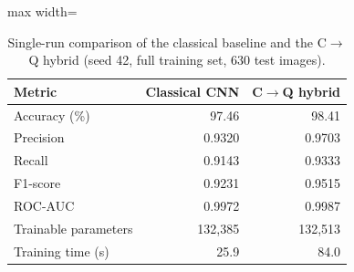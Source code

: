 \begin{table}[htbp]
\centering
\small
\caption{Single-run comparison of the classical baseline and the C$\rightarrow$Q hybrid (seed 42, full training set, 630 test images).}
\label{tab:baseline_vs_hybrid}
\begin{adjustbox}{max width=\linewidth}
\begin{tabular}{lrr}
\toprule
Metric & Classical CNN & C$\rightarrow$Q hybrid \\
\midrule
Accuracy (\%) & 97.46 & 98.41 \\
Precision & 0.9320 & 0.9703 \\
Recall & 0.9143 & 0.9333 \\
F1-score & 0.9231 & 0.9515 \\
ROC-AUC & 0.9972 & 0.9987 \\
Trainable parameters & 132,385 & 132,513 \\
Training time (s) & 25.9 & 84.0 \\
\bottomrule
\end{tabular}
\end{adjustbox}
\end{table}
